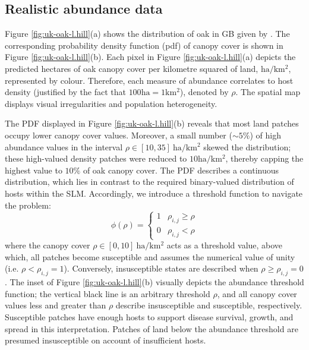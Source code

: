  \newpage

\subsection{Realistic abundance data}

Figure \ref{fig:uk-oak-l.hill}(a) shows the distribution of oak in GB given by \cite{hill.data}.
The corresponding probability density function (\acrshort{pdf}) of canopy cover is shown in Figure \ref{fig:uk-oak-l.hill}(b).
Each pixel in Figure \ref{fig:uk-oak-l.hill}(a) depicts the predicted hectares
of oak canopy cover per kilometre squared of land, $\mathrm{ha/km^{2}}$, represented by colour. 
Therefore, each measure of abundance correlates to host density
(justified by the fact that $100\mathrm{ha} = 1 \mathrm{km^2}$), denoted by $\rho$.
The spatial map displays visual irregularities and population heterogeneity.

The PDF displayed in Figure \ref{fig:uk-oak-l.hill}(b) 
reveals that most land patches occupy lower canopy cover values.
Moreover, a small number ($\sim 5\%$) of high abundance values in the interval
$\rho \in [10, 35]\ \mathrm{ha/km^2}$ skewed the distribution; these high-valued density patches were reduced to $10\mathrm{ha/km^2}$, 
thereby capping the highest value to $10\%$ of oak canopy cover. 
The PDF describes a continuous distribution, which lies in contrast to the required binary-valued distribution of hosts 
within the SLM. Accordingly, we introduce a threshold function to navigate the problem:  
\begin{equation}
  \phi(\rho) =
  \begin{cases}
    1 & \rho_{i,j}\geq\rho \\
    0 & \rho_{i,j}<\rho
  \end{cases}
\end{equation}
where the canopy cover $\rho\in[0, 10]\ \mathrm{ha/km^{2}}$ acts as a threshold value, 
above which, all patches become susceptible and assumes the numerical value of unity (i.e. $\rho < \rho_{i,j} = 1$).
Conversely, insusceptible states are described when $\rho \geq \rho_{i,j}= 0$.
The inset of Figure \ref{fig:uk-oak-l.hill}(b) visually depicts the abundance threshold function; 
the vertical black line is an arbitrary threshold $\rho$, and all canopy cover values less and greater than
$\rho$ describe insusceptible and susceptible, respectively.
Susceptible patches have enough hosts to support disease survival, growth, and spread in this interpretation. %
Patches of land below the abundance threshold are presumed insusceptible on account of insufficient hosts.

